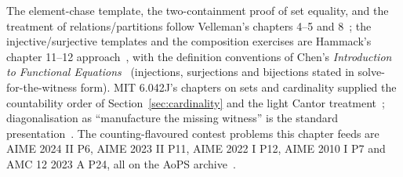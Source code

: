\chapternotes
The element-chase template, the two-containment proof of set equality, and
the treatment of relations/partitions follow Velleman's chapters 4--5 and
8~\cite{velleman}; the injective/surjective templates and the composition
exercises are Hammack's chapter 11--12 approach~\cite{hammack}, with the
definition conventions of Chen's \emph{Introduction to Functional
Equations}~\cite{chen-funceq} (injections, surjections and bijections
stated in solve-for-the-witness form). MIT 6.042J's chapters on sets and cardinality
supplied the countability order of Section~\ref{sec:cardinality} and the
light Cantor treatment~\cite{mcs}; diagonalisation as ``manufacture the
missing witness'' is the standard presentation~\cite{hammack,mcs}. The
counting-flavoured contest problems this chapter feeds are
AIME 2024 II P6, AIME 2023 II P11, AIME 2022 I P12, AIME 2010 I P7 and
AMC 12 2023 A P24, all on the AoPS archive~\cite{aops-amc}.
